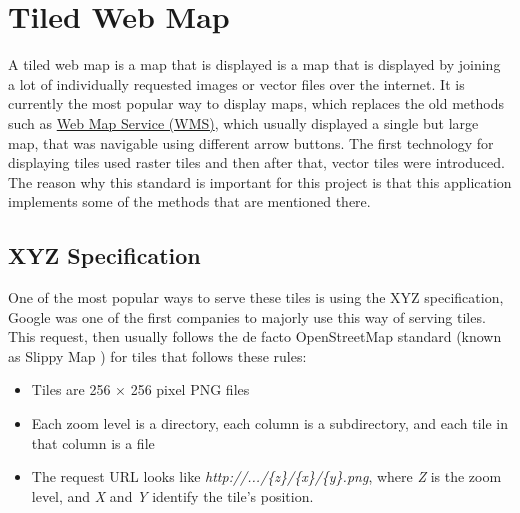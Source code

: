 \section{Tiled Web Map}
A tiled web map is a map that is displayed is a map that is displayed by joining a lot of individually requested images or vector files over the internet. It is currently the most popular way to display maps, which replaces the old methods such as \href{https://www.opengeospatial.org/standards/wms}{Web Map Service (WMS)}, which usually displayed a single but large map, that was navigable using different arrow buttons. The first technology for displaying tiles used raster tiles and then after that, vector tiles were introduced.\\
The reason why this standard is important for this project is that this application implements some of the methods that are mentioned there.\\
\subsection{XYZ Specification}
One of the most popular ways to serve these tiles is using the XYZ specification, Google was one of the first companies to majorly use this way of serving tiles. This request, then usually follows the de facto OpenStreetMap standard (known as Slippy Map \cite{WhatIsSlippyMap}) for tiles that follows these rules:
\begin{itemize}
\item Tiles are 256 × 256 pixel PNG files
\item Each zoom level is a directory, each column is a subdirectory, and each tile in that column is a file
\item The request URL looks like \textit{http://.../\{z\}/\{x\}/\{y\}.png}, where \textit{Z} is the zoom level, and \textit{X} and \textit{Y} identify the tile's position. 
\end{itemize}
